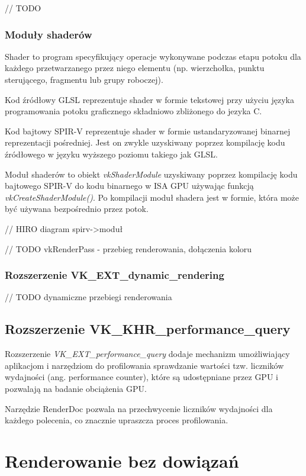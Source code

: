 // TODO

\subsubsection{Moduły shaderów}

Shader to program specyfikujący operacje wykonywane podczas etapu potoku dla każdego przetwarzanego przez niego elementu (np. wierzchołka, punktu sterującego, fragmentu lub grupy roboczej).

Kod źródłowy GLSL reprezentuje shader w formie tekstowej przy użyciu języka programowania potoku graficznego składniowo zbliżonego do jezyka C.

Kod bajtowy SPIR-V reprezentuje shader w formie ustandaryzowanej binarnej reprezentacji pośredniej. Jest on zwykle uzyskiwany poprzez kompilację kodu źródłowego w języku wyższego poziomu takiego jak GLSL.

Moduł shaderów to obiekt \textit{vkShaderModule} uzyskiwany poprzez kompilację kodu bajtowego SPIR-V do kodu binarnego w ISA GPU używając funkcją \textit{vkCreateShaderModule()}.
Po kompilacji moduł shadera jest w formie, która może być używana bezpośrednio przez potok.

// HIRO diagram spirv->moduł

// TODO vkRenderPass - przebieg renderowania, dołączenia koloru

\subsubsection{Rozszerzenie VK\_EXT\_dynamic\_rendering}

// TODO dynamiczne przebiegi renderowania

\subsection{Rozszerzenie VK\_KHR\_performance\_query}

Rozszerzenie \textit{VK\_EXT\_performance\_query} dodaje mechanizm umożliwiający aplikacjom i narzędziom do profilowania sprawdzanie wartości tzw. liczników wydajności (ang. performance counter), które są udostępniane przez GPU i pozwalają na badanie obciążenia GPU.

Narzędzie RenderDoc \cite{RENDERDOC} pozwala na przechwycenie liczników wydajności dla każdego polecenia, co znacznie upraszcza proces profilowania.



\section{Renderowanie bez dowiązań}

